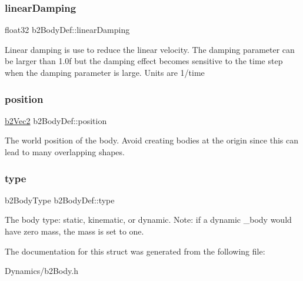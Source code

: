 \subsubsection{\texorpdfstring{linear\+Damping}{linearDamping}}
{\footnotesize\ttfamily float32 b2\+Body\+Def\+::linear\+Damping}

Linear damping is use to reduce the linear velocity. The damping parameter can be larger than 1.\+0f but the damping effect becomes sensitive to the time step when the damping parameter is large. Units are 1/time \mbox{\label{structb2BodyDef_a680cadc09ad6cf4b3366cbf0914c648b}} 
\subsubsection{\texorpdfstring{position}{position}}
{\footnotesize\ttfamily \mbox{\hyperlink{structb2Vec2}{b2\+Vec2}} b2\+Body\+Def\+::position}

The world position of the body. Avoid creating bodies at the origin since this can lead to many overlapping shapes. \mbox{\label{structb2BodyDef_a89cc3ad1873908042b002147b3861381}} 
\subsubsection{\texorpdfstring{type}{type}}
{\footnotesize\ttfamily b2\+Body\+Type b2\+Body\+Def\+::type}

The body type\+: static, kinematic, or dynamic. Note\+: if a dynamic _body would have zero mass, the mass is set to one.

The documentation for this struct was generated from the following file\+:\begin{DoxyCompactItemize}
\item 
Dynamics/b2\+Body.\+h\end{DoxyCompactItemize}
